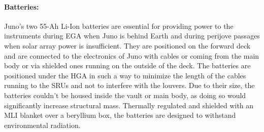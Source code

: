 \paragraph{Batteries:} Juno's two 55-Ah\cite{batteries_info} Li-Ion batteries are essential for providing power to the instruments during EGA when Juno is behind Earth and during perijove passages when solar array power is insufficient.\cite{batterie} They are positioned on the forward deck and are connected to the electronics of Juno with cables or coming from the main body or via shielded ones running on the outside of the deck. The batteries are positioned under the HGA in such a way to minimize the length of the cables running to the SRUs and not to interfere with the louvers.\cite{batteries_position} Due to their size, the batteries couldn't be housed inside the vault or main body, as doing so would significantly increase structural mass. Thermally regulated and shielded with an MLI blanket over a beryllium box, the batteries are designed to withstand environmental radiation.\cite{batteries_position}